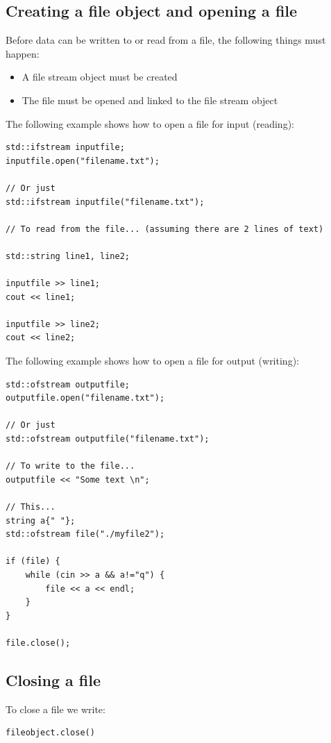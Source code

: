 \documentclass{report}
\begin{document}
    \pagebreak \bigbreak \noindent 
    \subsection{Creating a file object and opening a file}
    \bigbreak \noindent 
    Before data can be written to or read from a file, the following things must happen:
    \begin{itemize}
        \item A file stream object must be created
        \item The file must be opened and linked to the file stream object
    \end{itemize}
    \bigbreak \noindent 
    The following example shows how to open a file for input (reading):
    \bigbreak \noindent 
    \sepline
    \begin{verbatim}
std::ifstream inputfile;
inputfile.open("filename.txt");

// Or just
std::ifstream inputfile("filename.txt");

// To read from the file... (assuming there are 2 lines of text)

std::string line1, line2;

inputfile >> line1;
cout << line1;

inputfile >> line2;
cout << line2;
    \end{verbatim}
    \sepline
    \bigbreak \noindent 
    The following example shows how to open a file for output (writing):
    \bigbreak \noindent 
    \sepline
    \begin{verbatim}
std::ofstream outputfile;
outputfile.open("filename.txt");

// Or just
std::ofstream outputfile("filename.txt");

// To write to the file...
outputfile << "Some text \n";

// This...
string a{" "};
std::ofstream file("./myfile2");

if (file) {
    while (cin >> a && a!="q") {
        file << a << endl;
    }
}

file.close();
    \end{verbatim}
    \sepline

    \bigbreak \noindent 
    \subsection{Closing a file}
    \bigbreak \noindent 
    To close a file we write:
    \bigbreak \noindent 
    \sepline
    \begin{verbatim}
fileobject.close()
    \end{verbatim}
    \sepline
\end{document}
